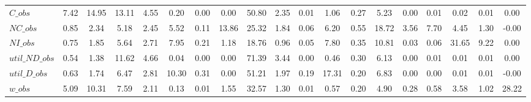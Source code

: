 \begin{center}
\begin{longtable}{lcccccccccccccccccc}
$C\_obs         $	 & 	            7.42	 & 	           14.95	 & 	           13.11	 & 	            4.55	 & 	            0.20	 & 	            0.00	 & 	            0.00	 & 	           50.80	 & 	            2.35	 & 	            0.01	 & 	            1.06	 & 	            0.27	 & 	            5.23	 & 	            0.00	 & 	            0.01	 & 	            0.02	 & 	            0.01	 & 	            0.00 \\ 
$NC\_obs        $	 & 	            0.85	 & 	            2.34	 & 	            5.18	 & 	            2.45	 & 	            5.52	 & 	            0.11	 & 	           13.86	 & 	           25.32	 & 	            1.84	 & 	            0.06	 & 	            6.20	 & 	            0.55	 & 	           18.72	 & 	            3.56	 & 	            7.70	 & 	            4.45	 & 	            1.30	 & 	           -0.00 \\ 
$NI\_obs        $	 & 	            0.75	 & 	            1.85	 & 	            5.64	 & 	            2.71	 & 	            7.95	 & 	            0.21	 & 	            1.18	 & 	           18.76	 & 	            0.96	 & 	            0.05	 & 	            7.80	 & 	            0.35	 & 	           10.81	 & 	            0.03	 & 	            0.06	 & 	           31.65	 & 	            9.22	 & 	            0.00 \\ 
$util\_ND\_obs  $	 & 	            0.54	 & 	            1.38	 & 	           11.62	 & 	            4.66	 & 	            0.04	 & 	            0.00	 & 	            0.00	 & 	           71.39	 & 	            3.44	 & 	            0.00	 & 	            0.46	 & 	            0.30	 & 	            6.13	 & 	            0.00	 & 	            0.01	 & 	            0.01	 & 	            0.01	 & 	            0.00 \\ 
$util\_D\_obs   $	 & 	            0.63	 & 	            1.74	 & 	            6.47	 & 	            2.81	 & 	           10.30	 & 	            0.31	 & 	            0.00	 & 	           51.21	 & 	            1.97	 & 	            0.19	 & 	           17.31	 & 	            0.20	 & 	            6.83	 & 	            0.00	 & 	            0.00	 & 	            0.01	 & 	            0.01	 & 	           -0.00 \\ 
$w\_obs         $	 & 	            5.09	 & 	           10.31	 & 	            7.59	 & 	            2.11	 & 	            0.13	 & 	            0.01	 & 	            1.55	 & 	           32.57	 & 	            1.30	 & 	            0.01	 & 	            0.57	 & 	            0.20	 & 	            4.90	 & 	            0.28	 & 	            0.58	 & 	            3.58	 & 	            1.02	 & 	           28.22 \\ 
\end{longtable}
 \end{center}
